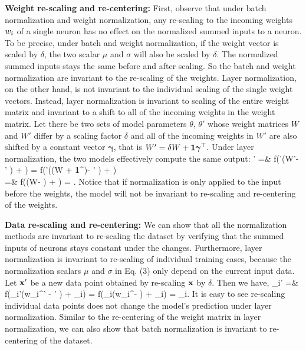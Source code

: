 \documentclass{article}
\begin{document}
{\textbf{Weight re-scaling and re-centering:}} First, observe that under batch normalization and weight normalization, any re-scaling to the incoming weights ${w}_i$ of a single neuron has no effect on the normalized summed inputs to a neuron.  To be precise, under batch and weight normalization, if the weight vector is scaled by $\delta$, the two scalar $\mu$ and $\sigma$ will also be scaled by $\delta$. The normalized summed inputs stays the same before and after scaling. So the batch and weight normalization are invariant to the re-scaling of the weights. Layer normalization, on the other hand,  is not invariant to the individual scaling of the single weight vectors. Instead, layer normalization is invariant to scaling of the entire weight matrix and invariant to a shift to all of the incoming weights in the weight matrix. Let there be two sets of model parameters $\theta$, $\theta'$ whose weight matrices $W$ and $W'$ differ by a scaling factor $\delta$ and all of the incoming weights in $W'$ are also shifted by a constant vector $\bm\gamma$, that is $W' = \delta W + {\bf 1}{\bm{\gamma}}^\top$. Under layer normalization, the two models effectively compute the same output:  
\bea
\Hidden' =& f({\Gain\over\sigma'}\left(W'\data - \mu' \right) + \Bias) = f({\Gain\over\sigma'}\left((\delta W + {\bf 1}{\bm{\gamma}}^\T)\data - \mu' \right) + \Bias) \nonumber \\
=& f({\Gain\over\sigma}\left(W\data - \mu \right) + \Bias) = \Hidden.
\eea
Notice that if normalization is only applied to the input before the weights, the model will not be invariant to re-scaling and re-centering of the weights.

{\textbf{Data re-scaling and re-centering:}} We can show that all the normalization methods are invariant to re-scaling the dataset by verifying that the summed inputs of neurons stays constant under the changes. Furthermore, layer normalization is invariant to re-scaling of individual training cases, because the normalization scalars $\mu$ and $\sigma$ in Eq. (3) only depend on the current input data. Let ${\bold x}'$ be a new data point obtained by re-scaling ${\bold x}$ by $\delta$. Then we have,   
\bea
\hidden_i' =& f({\gain_i\over\sigma'}\left(w_i^\T\data' - \mu' \right) + \bias_i)  
= f({\gain_i\over{\delta\sigma}}\left(\delta w_i^\T\data - \delta\mu \right) + \bias_i) = \hidden_i.
\eea
It is easy to see re-scaling individual data points does not change the model's prediction under layer normalization. Similar to the re-centering of the weight matrix in layer normalization, we can also show that batch normalization is invariant to re-centering of the dataset.
\end{document}
